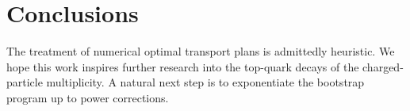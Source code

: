 \section{Conclusions}\label{sec:conclusions}

The treatment of numerical optimal transport plans is admittedly
heuristic. We hope this work inspires further research into the
top-quark decays of the charged-particle multiplicity. A natural next
step is to exponentiate the bootstrap program up to power corrections.

